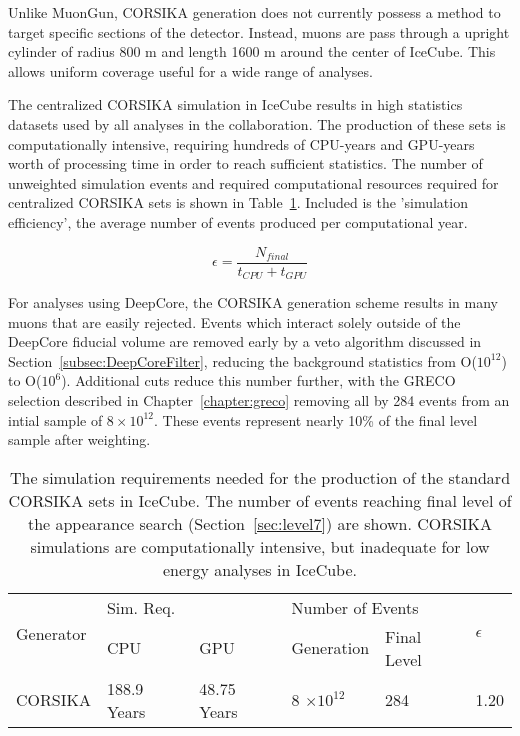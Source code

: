 Unlike MuonGun, CORSIKA generation does not currently possess a method to target specific sections of the detector. 
Instead, muons are pass through a upright cylinder of radius 800 m and length 1600 m around the center of IceCube.
This allows uniform coverage useful for a wide range of analyses.

The centralized CORSIKA simulation in IceCube results in high statistics datasets used by all analyses in the collaboration.
The production of these sets is computationally intensive, requiring hundreds of CPU-years and GPU-years worth of processing time in order to reach sufficient statistics.
The number of unweighted simulation events and required computational resources required for centralized CORSIKA sets is shown in Table~\ref{tab:corsika_stats}.
Included is the 'simulation efficiency', the average number of events produced per computational year.

\begin{equation}
\epsilon = \frac{N_{final}}{t_{CPU}+t_{GPU}}
\end{equation}

For analyses using DeepCore, the CORSIKA generation scheme results in many muons that are easily rejected.
Events which interact solely outside of the DeepCore fiducial volume are removed early by a veto algorithm discussed in Section~\ref{subsec:DeepCoreFilter}, reducing the background statistics from O($10^{12}$) to O($10^6$). 
Additional cuts reduce this number further, with the GRECO selection described in Chapter~\ref{chapter:greco} removing all by 284 events from an intial sample of $8\times 10^{12}$.
These events represent nearly 10\% of the final level sample after weighting.

\begin{table}[]
\centering
\begin{tabular}{@{}llllll@{}}
\toprule
\multirow{2}{*}{Generator} & \multicolumn{2}{l}{Sim. Req.} & \multicolumn{2}{l}{Number of Events} & \multirow{2}{*}{$\epsilon$} \\
                           & CPU                  & GPU                  & Generation               & Final Level         &                             \\ \midrule
CORSIKA                    & 188.9 Years          & 48.75 Years          & 8 $\times 10^{12}$         & 284                    & 1.20                        \\ \bottomrule
\end{tabular}
\caption{The simulation requirements needed for the production of the standard CORSIKA sets in IceCube. The number of events reaching final level of the appearance search (Section~\ref{sec:level7}) are shown. CORSIKA simulations are computationally intensive, but inadequate for low energy analyses in IceCube.}
\label{tab:corsika_stats}
\end{table} 


